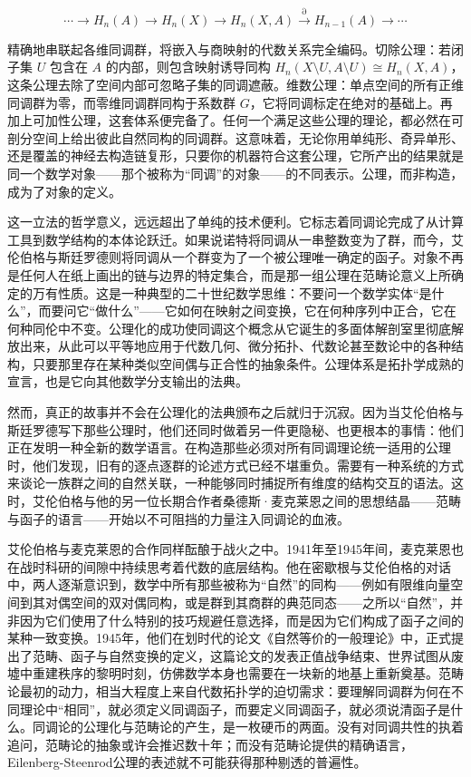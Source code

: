 \documentclass[12pt,a4paper]{article}
\begin{document}
\[
\cdots \longrightarrow H_n(A) \longrightarrow H_n(X) \longrightarrow H_n(X,A) \xrightarrow{\partial} H_{n-1}(A) \longrightarrow \cdots
\]

精确地串联起各维同调群，将嵌入与商映射的代数关系完全编码。切除公理：若闭子集 $U$ 包含在 $A$ 的内部，则包含映射诱导同构 $H_n(X \setminus U, A \setminus U) \cong H_n(X,A)$，这条公理去除了空间内部可忽略子集的同调遮蔽。维数公理：单点空间的所有正维同调群为零，而零维同调群同构于系数群 $G$，它将同调标定在绝对的基础上。再加上可加性公理，这套体系便完备了。任何一个满足这些公理的理论，都必然在可剖分空间上给出彼此自然同构的同调群。这意味着，无论你用单纯形、奇异单形、还是覆盖的神经去构造链复形，只要你的机器符合这套公理，它所产出的结果就是同一个数学对象——那个被称为“同调”的对象——的不同表示。公理，而非构造，成为了对象的定义。

这一立法的哲学意义，远远超出了单纯的技术便利。它标志着同调论完成了从计算工具到数学结构的本体论跃迁。如果说诺特将同调从一串整数变为了群，而今，艾伦伯格与斯廷罗德则将同调从一个群变为了一个被公理唯一确定的函子。对象不再是任何人在纸上画出的链与边界的特定集合，而是那一组公理在范畴论意义上所确定的万有性质。这是一种典型的二十世纪数学思维：不要问一个数学实体“是什么”，而要问它“做什么”——它如何在映射之间变换，它在何种序列中正合，它在何种同伦中不变。公理化的成功使同调这个概念从它诞生的多面体解剖室里彻底解放出来，从此可以平等地应用于代数几何、微分拓扑、代数论甚至数论中的各种结构，只要那里存在某种类似空间偶与正合性的抽象条件。公理体系是拓扑学成熟的宣言，也是它向其他数学分支输出的法典。

然而，真正的故事并不会在公理化的法典颁布之后就归于沉寂。因为当艾伦伯格与斯廷罗德写下那些公理时，他们还同时做着另一件更隐秘、也更根本的事情：他们正在发明一种全新的数学语言。在构造那些必须对所有同调理论统一适用的公理时，他们发现，旧有的逐点逐群的论述方式已经不堪重负。需要有一种系统的方式来谈论一族群之间的自然关联，一种能够同时捕捉所有维度的结构交互的语法。这时，艾伦伯格与他的另一位长期合作者桑德斯·麦克莱恩之间的思想结晶——范畴与函子的语言——开始以不可阻挡的力量注入同调论的血液。

艾伦伯格与麦克莱恩的合作同样酝酿于战火之中。1941年至1945年间，麦克莱恩也在战时科研的间隙中持续思考着代数的底层结构。他在密歇根与艾伦伯格的对话中，两人逐渐意识到，数学中所有那些被称为“自然”的同构——例如有限维向量空间到其对偶空间的双对偶同构，或是群到其商群的典范同态——之所以“自然”，并非因为它们使用了什么特别的技巧规避任意选择，而是因为它们构成了函子之间的某种一致变换。1945年，他们在划时代的论文《自然等价的一般理论》中，正式提出了范畴、函子与自然变换的定义，这篇论文的发表正值战争结束、世界试图从废墟中重建秩序的黎明时刻，仿佛数学本身也需要在一块新的地基上重新奠基。范畴论最初的动力，相当大程度上来自代数拓扑学的迫切需求：要理解同调群为何在不同理论中“相同”，就必须定义同调函子，而要定义同调函子，就必须说清函子是什么。同调论的公理化与范畴论的产生，是一枚硬币的两面。没有对同调共性的执着追问，范畴论的抽象或许会推迟数十年；而没有范畴论提供的精确语言，Eilenberg-Steenrod公理的表述就不可能获得那种剔透的普遍性。
\end{document}
